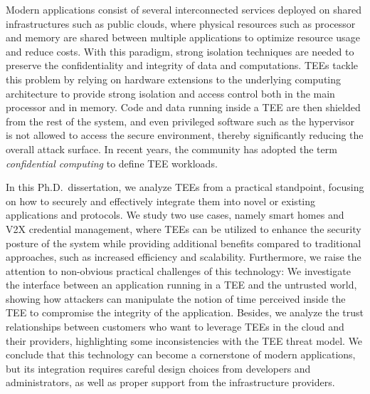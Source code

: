 Modern applications consist of several interconnected services deployed on
shared infrastructures such as public clouds, where physical resources such as
processor and memory are shared between multiple applications to optimize
resource usage and reduce costs. With this paradigm, strong isolation techniques
are needed to preserve the confidentiality and integrity of data and
computations. \acp{TEE} tackle this problem by relying on hardware extensions to
the underlying computing architecture to provide strong isolation and access
control both in the main processor and in memory. Code and data running inside a
\ac{TEE} are then shielded from the rest of the system, and even privileged
software such as the hypervisor is not allowed to access the secure environment,
thereby significantly reducing the overall attack surface. In recent years, the
community has adopted the term \emph{confidential computing} to define \ac{TEE}
workloads.

In this Ph.D.\ dissertation, we analyze \acp{TEE} from a practical standpoint,
focusing on how to securely and effectively integrate them into novel or
existing applications and protocols. We study two use cases, namely smart homes
and \ac{V2X} credential management, where \acp{TEE} can be utilized to enhance
the security posture of the system while providing additional benefits compared
to traditional approaches, such as increased efficiency and scalability.
Furthermore, we raise the attention to non-obvious practical challenges of this
technology: We investigate the interface between an application running in a
\ac{TEE} and the untrusted world, showing how attackers can manipulate the
notion of time perceived inside the \ac{TEE} to compromise the integrity of the
application. Besides, we analyze the trust relationships between customers who
want to leverage \acp{TEE} in the cloud and their providers, highlighting some
inconsistencies with the \ac{TEE} threat model. We conclude that this technology
can become a cornerstone of modern applications, but its integration requires
careful design choices from developers and administrators, as well as proper
support from the infrastructure providers.